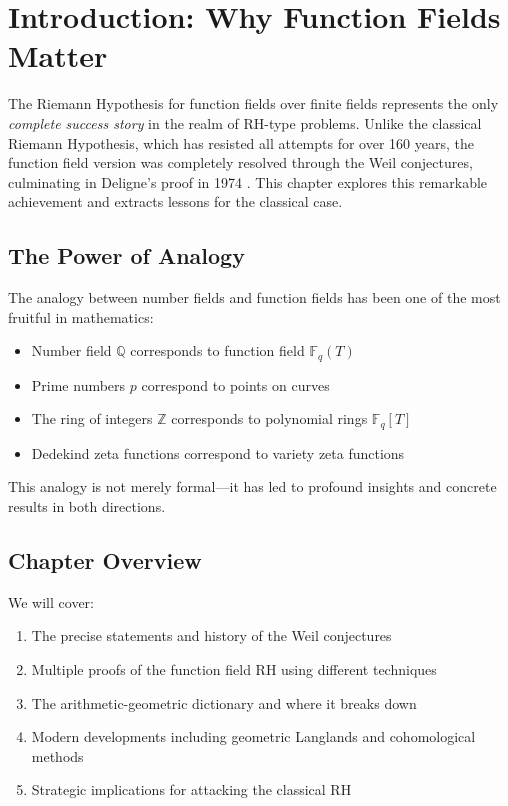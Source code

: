 
\section{Introduction: Why Function Fields Matter}

The Riemann Hypothesis for function fields over finite fields represents the only \emph{complete success story} in the realm of RH-type problems. Unlike the classical Riemann Hypothesis, which has resisted all attempts for over 160 years, the function field version was completely resolved through the Weil conjectures, culminating in Deligne's proof in 1974 \cite{deligne1974,deligne1980}. This chapter explores this remarkable achievement and extracts lessons for the classical case.

\subsection{The Power of Analogy}

The analogy between number fields and function fields has been one of the most fruitful in mathematics:
\begin{itemize}
\item Number field $\mathbb{Q}$ corresponds to function field $\mathbb{F}_q(T)$
\item Prime numbers $p$ correspond to points on curves
\item The ring of integers $\mathbb{Z}$ corresponds to polynomial rings $\mathbb{F}_q[T]$
\item Dedekind zeta functions correspond to variety zeta functions
\end{itemize}

This analogy is not merely formal—it has led to profound insights and concrete results in both directions.

\subsection{Chapter Overview}

We will cover:
\begin{enumerate}
\item The precise statements and history of the Weil conjectures
\item Multiple proofs of the function field RH using different techniques
\item The arithmetic-geometric dictionary and where it breaks down
\item Modern developments including geometric Langlands and cohomological methods
\item Strategic implications for attacking the classical RH
\end{enumerate}

